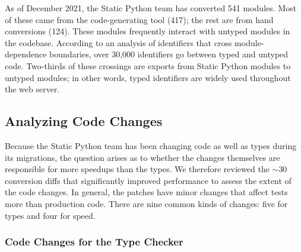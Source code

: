 \documentclass[english,cleveref,submission]{programming}
\newcommand{\SP}{Static Python}
\begin{document}
As of December 2021, the \SP{} team has converted 541 modules.
Most of these came from the code-generating tool (417); the rest
are from hand conversions (124).
These modules frequently interact with untyped modules in the codebase.
According to an analysis of identifiers that cross module-dependence
boundaries, over 30,000 identifiers go between typed and untyped code.
Two-thirds of these crossings are exports from \SP{} modules
to untyped modules; in other words, typed identifiers are widely used
throughout the web server.



\subsection{Analyzing Code Changes}
\label{s:code-changes}

Because the \SP{} team has been changing code as well as types during its
migrations, the question arises as to whether the changes themselves
are responsible for more speedups than the types.
We therefore reviewed the $\sim 30$ conversion diffs that significantly improved
performance to assess the extent of the code changes.
In general, the patches have minor changes that
affect tests more than production code.
There are nine common kinds of changes: five for types and four for speed.


\subsubsection{Code Changes for the Type Checker}
\label{s:behavior-changes}
\end{document}
